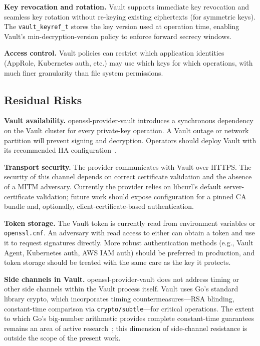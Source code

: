 \documentclass[sigconf,10pt]{acmart}
\begin{document}
\textbf{Key revocation and rotation.}  Vault supports immediate key
revocation and seamless key rotation without re-keying existing ciphertexts
(for symmetric keys).  The \texttt{vault\_keyref\_t} stores the key version
used at operation time, enabling Vault's min-decryption-version policy to
enforce forward secrecy windows.

\textbf{Access control.}  Vault policies can restrict which application
identities (AppRole, Kubernetes auth, etc.) may use which keys for which
operations, with much finer granularity than file system permissions.

\subsection{Residual Risks}

\textbf{Vault availability.}  openssl-provider-vault introduces a synchronous
dependency on the Vault cluster for every private-key operation.  A Vault
outage or network partition will prevent signing and decryption.  Operators
should deploy Vault with its recommended HA configuration~\cite{vault-ha}.

\textbf{Transport security.}  The provider communicates with Vault over
HTTPS.  The security of this channel depends on correct certificate
validation and the absence of a MITM adversary.  Currently the provider
relies on libcurl's default server-certificate validation; future work
should expose configuration for a pinned CA bundle and, optionally,
client-certificate-based authentication.

\textbf{Token storage.}  The Vault token is currently read from environment
variables or \texttt{openssl.cnf}.  An adversary with read access to either
can obtain a token and use it to request signatures directly.  More
robust authentication methods (e.g., Vault Agent, Kubernetes auth, AWS IAM
auth) should be preferred in production, and token storage should be treated
with the same care as the key it protects.

\textbf{Side channels in Vault.}  openssl-provider-vault does not address timing
or other side channels within the Vault process itself.  Vault uses
Go's standard library crypto, which incorporates timing countermeasures---RSA
blinding, constant-time comparison via \texttt{crypto/subtle}---for critical
operations.  The extent to which Go's big-number arithmetic provides complete
constant-time guarantees remains an area of active research~\cite{go-constant-time-bignum};
this dimension of side-channel resistance is outside the scope of the present work.
\end{document}
